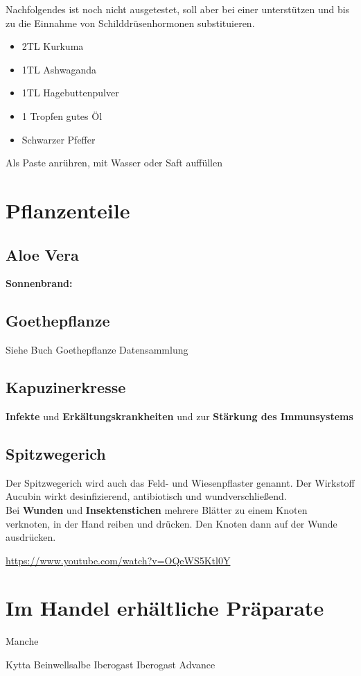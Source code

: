 Nachfolgendes ist noch nicht ausgetestet, soll aber bei einer  unterstützen und bis zu die Einnahme von Schilddrüsenhormonen substituieren.

\begin{itemize}
	\item 2TL Kurkuma
	\item 1TL Ashwaganda
	\item 1TL Hagebuttenpulver
	\item 1 Tropfen gutes Öl
	\item Schwarzer Pfeffer
\end{itemize}

Als Paste anrühren, mit Wasser oder Saft auffüllen



\section{Pflanzenteile}


\subsection{Aloe Vera}

\textbf{Sonnenbrand:}


\subsection{Goethepflanze}

Siehe Buch Goethepflanze Datensammlung



\subsection{Kapuzinerkresse}

\textbf{Infekte} und \textbf{Erkältungskrankheiten} und zur \textbf{Stärkung des Immunsystems}

  






\subsection{Spitzwegerich}

Der Spitzwegerich wird auch das Feld- und Wiesenpflaster genannt. Der Wirkstoff Aucubin wirkt desinfizierend, antibiotisch und wundverschließend.\\
Bei \textbf{Wunden} und \textbf{Insektenstichen} mehrere Blätter zu einem Knoten verknoten, in der Hand reiben und drücken. Den Knoten dann auf der Wunde ausdrücken. 

 

\cite{swrhandwerkskunst}  

\url{https://www.youtube.com/watch?v=OQeWS5Ktl0Y}



\section{Im Handel erhältliche Präparate}

Manche

Kytta Beinwellsalbe
Iberogast
Iberogast Advance


